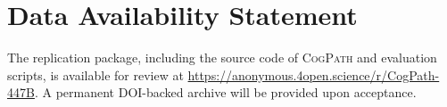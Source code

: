 \section{Data Availability Statement}
The replication package, including the source code of \textsc{CogPath} and evaluation scripts, is available for review at \url{https://anonymous.4open.science/r/CogPath-447B}. 
A permanent DOI-backed archive will be provided upon acceptance.
